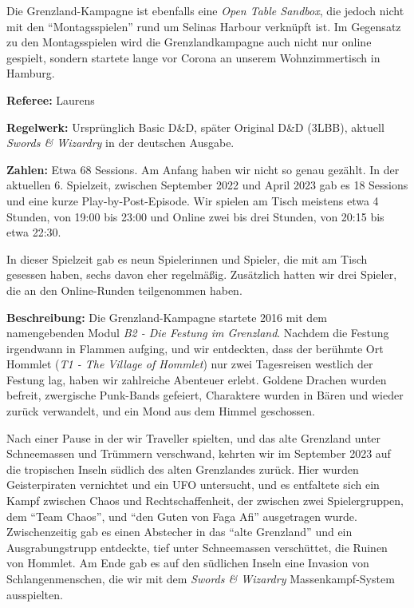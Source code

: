 \documentclass[11pt]{wbzine}
\begin{document}
\begin{multicols}{2}
Die Grenzland-Kampagne ist ebenfalls eine \textit{Open Table Sandbox},
die jedoch nicht mit den ``Montagsspielen'' rund um Selinas Harbour
verknüpft ist. Im Gegensatz zu den Montagsspielen wird die
Grenzlandkampagne auch nicht nur online gespielt, sondern startete
lange vor Corona an unserem Wohnzimmertisch in Hamburg.

\textbf{Referee:} Laurens

\textbf{Regelwerk:} Ursprünglich Basic D\&D, später Original D\&D
(3LBB),
aktuell \textit{Swords \& Wizardry} in der deutschen Ausgabe.

\textbf{Zahlen:} Etwa 68 Sessions. Am Anfang haben wir nicht so
genau gezählt. In der aktuellen 6. Spielzeit, zwischen September
2022 und April 2023 gab es 18 Sessions und eine kurze
Play-by-Post-Episode. Wir spielen am Tisch meistens etwa 4 Stunden,
von 19:00 bis 23:00 und Online zwei bis drei Stunden, von 20:15 bis
etwa 22:30.

In dieser Spielzeit gab es neun Spielerinnen und Spieler, die mit am
Tisch gesessen haben, sechs davon eher regelmäßig. Zusätzlich
hatten wir drei Spieler, die an den Online-Runden teilgenommen
haben.

\textbf{Beschreibung:} Die Grenzland-Kampagne startete 2016 mit dem
namengebenden Modul \textit{B2 - Die Festung im Grenzland}. Nachdem
die Festung irgendwann in Flammen aufging, und wir entdeckten, dass
der berühmte Ort Hommlet (\textit{T1 - The Village of Hommlet}) nur
zwei Tagesreisen westlich der Festung lag, haben wir zahlreiche
Abenteuer erlebt. Goldene Drachen wurden befreit, zwergische
Punk-Bands gefeiert, Charaktere wurden in Bären und wieder zurück
verwandelt, und ein Mond aus dem Himmel geschossen.

Nach einer Pause in der wir Traveller spielten, und das alte
Grenzland unter Schneemassen und Trümmern verschwand, kehrten wir im
September 2023 auf die tropischen Inseln südlich des alten
Grenzlandes zurück. Hier wurden Geisterpiraten vernichtet und ein
UFO untersucht, und es entfaltete sich ein Kampf zwischen Chaos und
Rechtschaffenheit, der zwischen zwei Spielergruppen, dem ``Team
Chaos'', und ``den Guten von Faga Afi'' ausgetragen wurde.
Zwischenzeitig gab es einen Abstecher in das ``alte Grenzland'' und
ein Ausgrabungstrupp entdeckte, tief unter Schneemassen verschüttet,
die Ruinen von Hommlet.
Am Ende gab es auf den südlichen Inseln
eine Invasion von Schlangenmenschen, die wir mit dem \textit{Swords
\& Wizardry} Massenkampf-System ausspielten.









\end{multicols}
\end{document}
